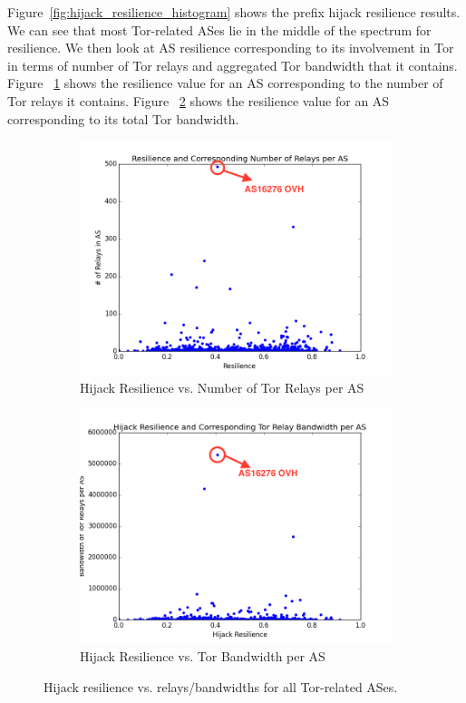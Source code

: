 Figure~\ref{fig:hijack_resilience_histogram} shows the prefix hijack resilience results. We can see that most Tor-related ASes lie in the middle of the spectrum for resilience. We then look at AS resilience corresponding to its involvement in Tor in terms of number of Tor relays and aggregated Tor bandwidth that it contains. Figure ~\ref{fig:res_relays} shows the resilience value for an AS corresponding to the number of Tor relays it contains. Figure ~\ref{fig:hijack_bw} shows the resilience value for an AS corresponding to its total Tor bandwidth. 

\begin{figure}[ht!]
\centering
\begin{subfigure}{.25\textwidth}
  \centering
  \includegraphics[width=\linewidth]{new_resilience_per_as}
  \caption{Hijack Resilience vs. Number of Tor Relays per AS}
  \label{fig:res_relays}
\end{subfigure}%
\begin{subfigure}{.25\textwidth}
  \centering
  \includegraphics[width=\linewidth]{new_bandwidth}
  \caption{Hijack Resilience vs. Tor Bandwidth per AS}
  \label{fig:hijack_bw}
\end{subfigure}
\caption{Hijack resilience vs. relays/bandwidths for all Tor-related ASes.}
\label{fig:hijack_as}
\end{figure}

